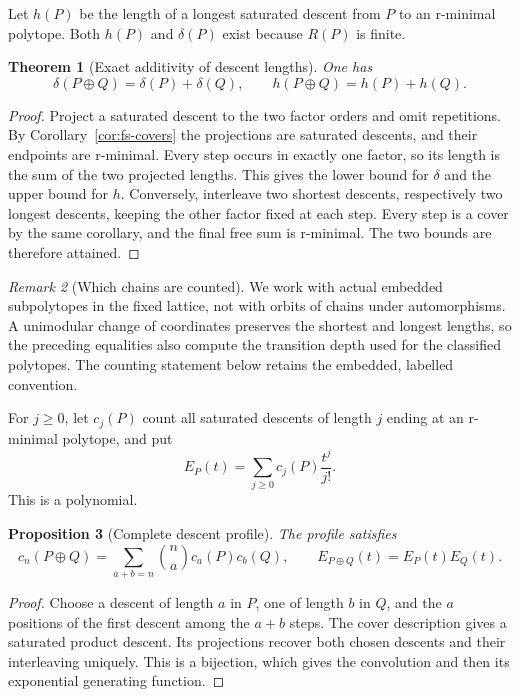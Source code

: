 \documentclass[manuscript]{aomart}
\newtheorem{theorem}{Theorem}
\newtheorem{proposition}[theorem]{Proposition}
\theoremstyle{definition}
\theoremstyle{remark}
\newtheorem{remark}[theorem]{Remark}
\begin{document}
Let $h(P)$ be the length of a longest saturated descent from $P$ to an
r-minimal polytope. Both $h(P)$ and $\delta(P)$ exist because $R(P)$ is
finite.

\begin{theorem}[Exact additivity of descent lengths]\label{thm:fs-depth}
One has
\[
 \delta(P\oplus Q)=\delta(P)+\delta(Q),\qquad
 h(P\oplus Q)=h(P)+h(Q).
\]
\end{theorem}
\begin{proof}
Project a saturated descent to the two factor orders and omit repetitions.
By Corollary~\ref{cor:fs-covers} the projections are saturated descents,
and their endpoints are r-minimal. Every step occurs in exactly one
factor, so its length is the sum of the two projected lengths. This
gives the lower bound for $\delta$ and the upper bound for $h$.
Conversely, interleave two shortest descents, respectively two longest
descents, keeping the other factor fixed at each step. Every step is a
cover by the same corollary, and the final free sum is r-minimal.
The two bounds are therefore attained.
\end{proof}

\begin{remark}[Which chains are counted]
We work with actual embedded subpolytopes in the fixed lattice, not with
orbits of chains under automorphisms. A unimodular change of coordinates
preserves the shortest and longest lengths, so the preceding equalities
also compute the transition depth used for the classified polytopes.
The counting statement below retains the embedded, labelled convention.
\end{remark}

For $j\ge0$, let $c_j(P)$ count all saturated descents of length $j$
ending at an r-minimal polytope, and put
\[
 E_P(t)=\sum_{j\ge0}c_j(P)\frac{t^j}{j!}.
\]
This is a polynomial.

\begin{proposition}[Complete descent profile]\label{prop:fs-profile}
The profile satisfies
\[
 c_n(P\oplus Q)=\sum_{a+b=n}\binom{n}{a}c_a(P)c_b(Q),
 \qquad E_{P\oplus Q}(t)=E_P(t)E_Q(t).
\]
\end{proposition}
\begin{proof}
Choose a descent of length $a$ in $P$, one of length $b$ in $Q$, and the
$a$ positions of the first descent among the $a+b$ steps. The cover
description gives a saturated product descent. Its projections recover
both chosen descents and their interleaving uniquely. This is a bijection,
which gives the convolution and then its exponential generating function.
\end{proof}
\end{document}
